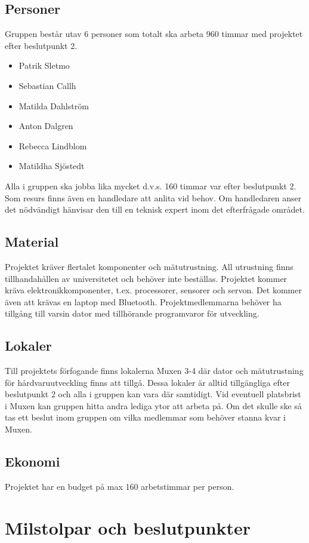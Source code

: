 \documentclass{article}
\begin{document}
\subsection{Personer}
Gruppen består utav 6 personer som totalt ska arbeta 960 timmar med projektet efter beslutpunkt 2.
\begin{itemize}
  \item Patrik Sletmo
  \item Sebastian Callh
  \item Matilda Dahlström
  \item Anton Dalgren
  \item Rebecca Lindblom
  \item Matildha Sjöstedt
\end{itemize}
Alla i gruppen ska jobba lika mycket d.v.s. 160 timmar var efter beslutpunkt 2.
\newline\newline
Som resurs finns även en handledare att anlita vid behov. Om handledaren anser det nödvändigt hänvisar den till en teknisk expert inom det efterfrågade området. 
\subsection{Material}
Projektet kräver flertalet komponenter och mätutrustning. All utrustning finns tillhandahållen av universitetet och behöver inte beställas. Projektet kommer kräva elektronikkomponenter, t.ex. processorer, sensorer och servon. Det kommer även att krävas en laptop med Bluetooth. Projektmedlemmarna behöver ha tillgång till varsin dator med tillhörande programvaror för utveckling.   
\subsection{Lokaler}
Till projektets förfogande finns lokalerna Muxen 3-4 där dator och mätutrustning för hårdvaruutveckling finns att tillgå. Dessa lokaler är alltid tillgängliga efter beslutpunkt 2 och alla i gruppen kan vara där samtidigt. Vid eventuell platsbrist i Muxen kan gruppen hitta andra lediga ytor att arbeta på. Om det skulle ske så tas ett beslut inom gruppen om vilka medlemmar som behöver stanna kvar i Muxen.
\subsection{Ekonomi}
Projektet har en budget på max 160 arbetstimmar per person.

\section{Milstolpar och beslutpunkter}
\end{document}
